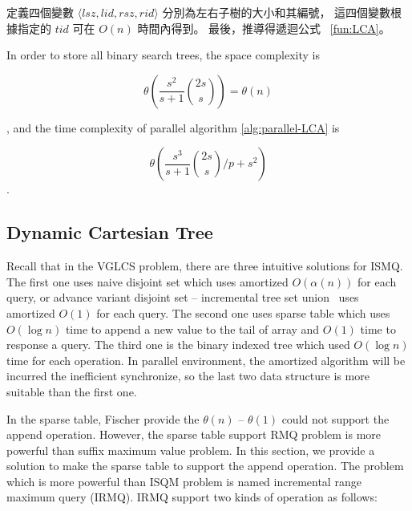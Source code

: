 定義四個變數 $\langle\mathit{lsz},\mathit{lid},\mathit{rsz},\mathit{rid}\rangle$ 分別為左右子樹的大小和其編號，
這四個變數根據指定的 $\mathit{tid}$ 可在 $O(n)$ 時間內得到。
最後，推導得遞迴公式 ~\ref{fun:LCA}。 
\fi



In order to store all binary search trees, the space complexity is 

\begin{equation}
\theta\left(\frac{s^2}{s+1} \binom{2s}{s}\right) = \theta\left(n\right)
\end{equation}

, and the time complexity of parallel algorithm \ref{alg:parallel-LCA}
is

\begin{equation}
\theta\left(\frac{s^3}{s+1} \binom{2s}{s} \bigg/ p + s^2 \right)
\end{equation}.

\iffalse
為記錄所有的二元搜尋樹的 LCA，空間消耗 $\theta\left(\frac{s^2}{s+1} \binom{2s}{s}\right) = \theta\left(n\right)$；
其平行算法 \ref{alg:parallel-LCA} 的時間複雜度如下：

\begin{equation}
\theta\left(\frac{s^3}{s+1} \binom{2s}{s} \bigg/ p + s^2 \right)
\end{equation}.
\fi



\subsection{Dynamic Cartesian Tree}

Recall that in the VGLCS problem, there are three intuitive solutions
for ISMQ.  The first one uses naive disjoint set which uses amortized
$O(\alpha(n))$ for each query, or advance variant disjoint set --
incremental tree set union~\cite{Gabow1983ALA} uses amortized $O(1)$ for
each query.  The second one uses sparse table which uses $O(\log n)$
time to append a new value to the tail of array and $O(1)$ time to
response a query.  The third one is the binary indexed tree which used
$O(\log n)$ time for each operation.  In parallel environment, the
amortized algorithm will be incurred the inefficient synchronize, so the
last two data structure is more suitable than the first one.

In the sparse table, Fischer provide the $\theta(n)$ -- $\theta(1)$
could not support the append operation.  However, the sparse table
support RMQ problem is more powerful than suffix maximum value
problem.  In this section, we provide a solution to make the sparse
table to support the append operation.  The problem which is more
powerful than ISQM problem is named incremental range maximum query
(IRMQ).  IRMQ support two kinds of operation as follows:

